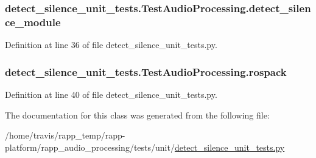 \hypertarget{classdetect__silence__unit__tests_1_1TestAudioProcessing_a091f6edd6c581d6bfb165a2aca2fd170}{
\subsubsection[{detect\-\_\-silence\-\_\-module}]{\setlength{\rightskip}{0pt plus 5cm}detect\-\_\-silence\-\_\-unit\-\_\-tests.\-Test\-Audio\-Processing.\-detect\-\_\-silence\-\_\-module}}\label{classdetect__silence__unit__tests_1_1TestAudioProcessing_a091f6edd6c581d6bfb165a2aca2fd170}


Definition at line 36 of file detect\-\_\-silence\-\_\-unit\-\_\-tests.\-py.

\hypertarget{classdetect__silence__unit__tests_1_1TestAudioProcessing_a484d0d9f66b7ff88516f206070db6afb}{
\subsubsection[{rospack}]{\setlength{\rightskip}{0pt plus 5cm}detect\-\_\-silence\-\_\-unit\-\_\-tests.\-Test\-Audio\-Processing.\-rospack}}\label{classdetect__silence__unit__tests_1_1TestAudioProcessing_a484d0d9f66b7ff88516f206070db6afb}


Definition at line 40 of file detect\-\_\-silence\-\_\-unit\-\_\-tests.\-py.



The documentation for this class was generated from the following file\-:\begin{DoxyCompactItemize}
\item 
/home/travis/rapp\-\_\-temp/rapp-\/platform/rapp\-\_\-audio\-\_\-processing/tests/unit/\hyperlink{detect__silence__unit__tests_8py}{detect\-\_\-silence\-\_\-unit\-\_\-tests.\-py}\end{DoxyCompactItemize}
